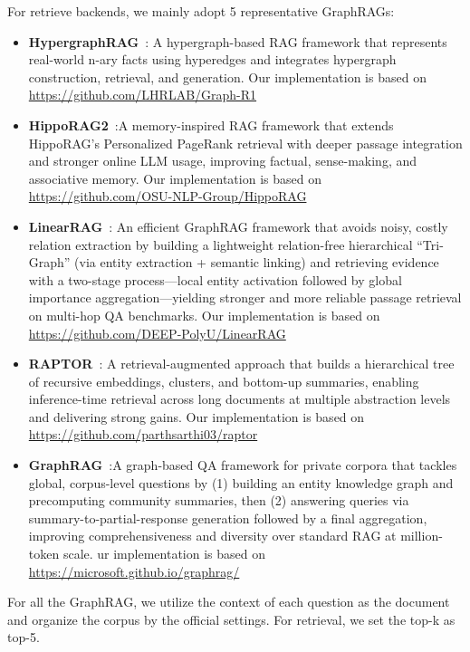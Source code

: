 For retrieve backends, we mainly adopt 5 representative GraphRAGs:
\begin{itemize}
    \item \textbf{HypergraphRAG}~\cite{luo2025hypergraphrag}: A hypergraph-based RAG framework that represents real-world n-ary facts using hyperedges and integrates hypergraph construction, retrieval, and generation. Our implementation is based on \url{https://github.com/LHRLAB/Graph-R1}
    \item \textbf{HippoRAG2}~\cite{gutiérrez2025hipporag2}:A memory-inspired RAG framework that extends HippoRAG’s Personalized PageRank retrieval with deeper passage integration and stronger online LLM usage, improving factual, sense-making, and associative memory. Our implementation is based on \url{https://github.com/OSU-NLP-Group/HippoRAG}
    \item \textbf{LinearRAG}~\cite{zhuang2025linearrag}: An efficient GraphRAG framework that avoids noisy, costly relation extraction by building a lightweight relation-free hierarchical “Tri-Graph” (via entity extraction + semantic linking) and retrieving evidence with a two-stage process—local entity activation followed by global importance aggregation—yielding stronger and more reliable passage retrieval on multi-hop QA benchmarks. Our implementation is based on \url{https://github.com/DEEP-PolyU/LinearRAG}
    \item \textbf{RAPTOR}~\cite{sarthi2024raptor}: A retrieval-augmented approach that builds a hierarchical tree of recursive embeddings, clusters, and bottom-up summaries, enabling inference-time retrieval across long documents at multiple abstraction levels and delivering strong gains. Our implementation is based on \url{https://github.com/parthsarthi03/raptor}
    \item \textbf{GraphRAG}~\cite{edge2024local}:A graph-based QA framework for private corpora that tackles global, corpus-level questions by (1) building an entity knowledge graph and precomputing community summaries, then (2) answering queries via summary-to-partial-response generation followed by a final aggregation, improving comprehensiveness and diversity over standard RAG at million-token scale. ur implementation is based on \url{https://microsoft.github.io/graphrag/}
\end{itemize}
For all the GraphRAG, we utilize the context of each question as the document and organize the corpus by the official settings. For retrieval, we set the top-k as top-5.
